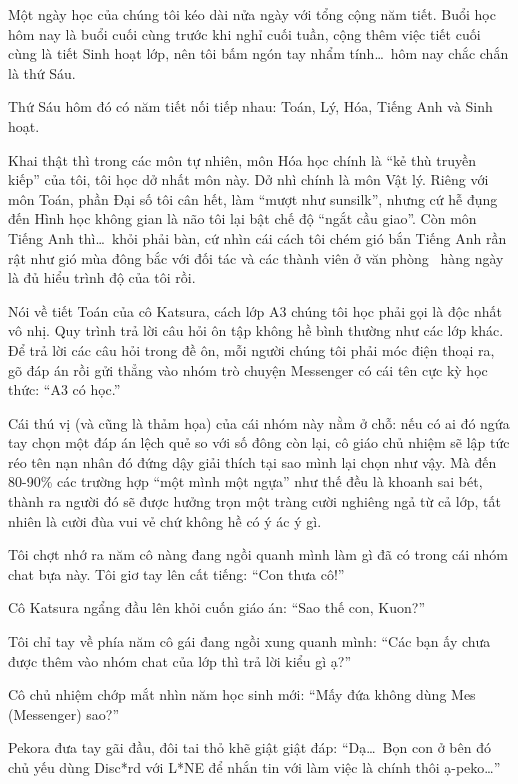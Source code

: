 \documentclass[../main.tex]{subfiles}
\begin{document}
Một ngày học của chúng tôi kéo dài nửa ngày với tổng cộng năm tiết. Buổi học hôm nay là buổi cuối cùng trước khi nghỉ cuối tuần, cộng thêm việc tiết cuối cùng là tiết Sinh hoạt lớp, nên tôi bấm ngón tay nhẩm tính\dots\ hôm nay chắc chắn là thứ Sáu.

Thứ Sáu hôm đó có năm tiết nối tiếp nhau: Toán, Lý, Hóa, Tiếng Anh và Sinh hoạt.

Khai thật thì trong các môn tự nhiên, môn Hóa học chính là ``kẻ thù truyền kiếp'' của tôi, tôi học dở nhất môn này. Dở nhì chính là môn Vật lý. Riêng với môn Toán, phần Đại số tôi cân hết, làm ``mượt như sunsilk'', nhưng cứ hễ đụng đến Hình học không gian là não tôi lại bật chế độ ``ngắt cầu giao''. Còn môn Tiếng Anh thì\dots\ khỏi phải bàn, cứ nhìn cái cách tôi chém gió bắn Tiếng Anh rần rật như gió mùa đông bắc với đối tác và các thành viên ở văn phòng \hll\ hàng ngày là đủ hiểu trình độ của tôi rồi.

Nói về tiết Toán của cô Katsura, cách lớp A3 chúng tôi học phải gọi là độc nhất vô nhị. Quy trình trả lời câu hỏi ôn tập không hề bình thường như các lớp khác. Để trả lời các câu hỏi trong đề ôn, mỗi người chúng tôi phải móc điện thoại ra, gõ đáp án rồi gửi thẳng vào nhóm trò chuyện Messenger có cái tên cực kỳ học thức: ``A3 có học.''

Cái thú vị (và cũng là thảm họa) của cái nhóm này nằm ở chỗ: nếu có ai đó ngứa tay chọn một đáp án lệch quẻ so với số đông còn lại, cô giáo chủ nhiệm sẽ lập tức réo tên nạn nhân đó đứng dậy giải thích tại sao mình lại chọn như vậy. Mà đến 80-90\% các trường hợp ``một mình một ngựa'' như thế đều là khoanh sai bét, thành ra người đó sẽ được hưởng trọn một tràng cười nghiêng ngả từ cả lớp, tất nhiên là cười đùa vui vẻ chứ không hề có ý ác ý gì.

Tôi chợt nhớ ra năm cô nàng đang ngồi quanh mình làm gì đã có trong cái nhóm chat bựa này. Tôi giơ tay lên cất tiếng: ``Con thưa cô!''

Cô Katsura ngẩng đầu lên khỏi cuốn giáo án: ``Sao thế con, Kuon?''

Tôi chỉ tay về phía năm cô gái đang ngồi xung quanh mình: ``Các bạn ấy chưa được thêm vào nhóm chat của lớp thì trả lời kiểu gì ạ?''

Cô chủ nhiệm chớp mắt nhìn năm học sinh mới: ``Mấy đứa không dùng Mes (Messenger) sao?''

Pekora đưa tay gãi đầu, đôi tai thỏ khẽ giật giật đáp: ``Dạ\dots\ Bọn con ở bên đó chủ yếu dùng Disc*rd với L*NE để nhắn tin với làm việc là chính thôi ạ-peko\dots''
\end{document}
